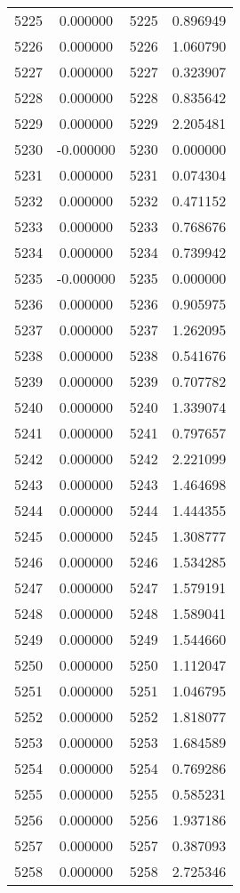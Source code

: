 \documentclass[12pt]{article}
\begin{document}
\begin{longtable}{@{}cccc@{}}
5225 & 0.000000 & 5225 & 0.896949 \\
5226 & 0.000000 & 5226 & 1.060790 \\
5227 & 0.000000 & 5227 & 0.323907 \\
5228 & 0.000000 & 5228 & 0.835642 \\
5229 & 0.000000 & 5229 & 2.205481 \\
5230 & -0.000000 & 5230 & 0.000000 \\
5231 & 0.000000 & 5231 & 0.074304 \\
5232 & 0.000000 & 5232 & 0.471152 \\
5233 & 0.000000 & 5233 & 0.768676 \\
5234 & 0.000000 & 5234 & 0.739942 \\
5235 & -0.000000 & 5235 & 0.000000 \\
5236 & 0.000000 & 5236 & 0.905975 \\
5237 & 0.000000 & 5237 & 1.262095 \\
5238 & 0.000000 & 5238 & 0.541676 \\
5239 & 0.000000 & 5239 & 0.707782 \\
5240 & 0.000000 & 5240 & 1.339074 \\
5241 & 0.000000 & 5241 & 0.797657 \\
5242 & 0.000000 & 5242 & 2.221099 \\
5243 & 0.000000 & 5243 & 1.464698 \\
5244 & 0.000000 & 5244 & 1.444355 \\
5245 & 0.000000 & 5245 & 1.308777 \\
5246 & 0.000000 & 5246 & 1.534285 \\
5247 & 0.000000 & 5247 & 1.579191 \\
5248 & 0.000000 & 5248 & 1.589041 \\
5249 & 0.000000 & 5249 & 1.544660 \\
5250 & 0.000000 & 5250 & 1.112047 \\
5251 & 0.000000 & 5251 & 1.046795 \\
5252 & 0.000000 & 5252 & 1.818077 \\
5253 & 0.000000 & 5253 & 1.684589 \\
5254 & 0.000000 & 5254 & 0.769286 \\
5255 & 0.000000 & 5255 & 0.585231 \\
5256 & 0.000000 & 5256 & 1.937186 \\
5257 & 0.000000 & 5257 & 0.387093 \\
5258 & 0.000000 & 5258 & 2.725346 \\

\end{longtable}
\end{document}
